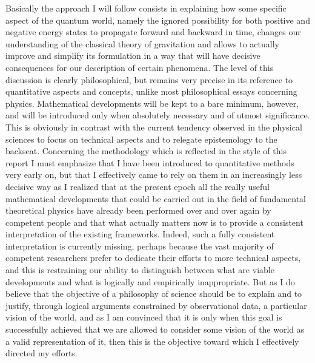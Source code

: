 \documentclass[notitlepage,12pt]{report}
\begin{document}
Basically the approach I will follow consists in explaining how some specific aspect of the quantum world, namely the ignored possibility for both positive and negative energy states to propagate forward and backward in time, changes our understanding of the classical theory of gravitation and allows to actually improve and simplify its formulation in a way that will have decisive consequences for our description of certain phenomena. The level of this discussion is clearly philosophical, but remains very precise in its reference to quantitative aspects and concepts, unlike most philosophical essays concerning physics. Mathematical developments will be kept to a bare minimum, however, and will be introduced only when absolutely necessary and of utmost significance. This is obviously in contrast with the current tendency observed in the physical sciences to focus on technical aspects and to relegate epistemology to the backseat. Concerning the methodology which is reflected in the style of this report I must emphasize that I have been introduced to quantitative methods very early on, but that I effectively came to rely on them in an increasingly less decisive way as I realized that at the present epoch all the really useful mathematical developments that could be carried out in the field of fundamental theoretical physics have already been performed over and over again by competent people and that what actually matters now is to provide a consistent interpretation of the existing frameworks. Indeed, such a fully consistent interpretation is currently missing, perhaps because the vast majority of competent researchers prefer to dedicate their efforts to more technical aspects, and this is restraining our ability to distinguish between what are viable developments and what is logically and empirically inappropriate. But as I do believe that the objective of a philosophy of science should be to explain and to justify, through logical arguments constrained by observational data, a particular vision of the world, and as I am convinced that it is only when this goal is successfully achieved that we are allowed to consider some vision of the world as a valid representation of it, then this is the objective toward which I effectively directed my efforts.
\end{document}
